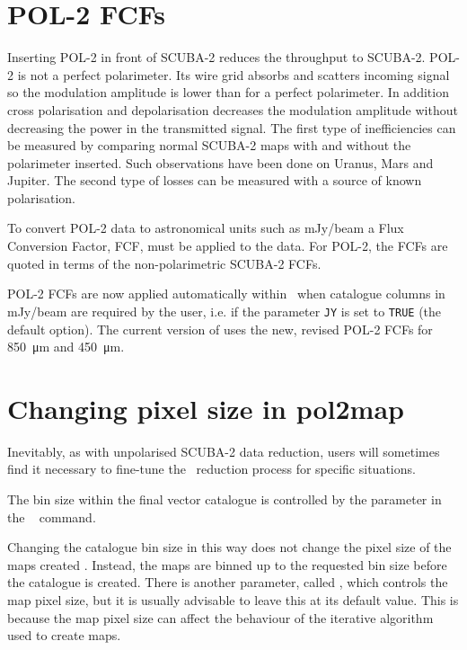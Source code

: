 \section{POL-2 FCFs}
\label{sec:pol2map-fcf}

Inserting POL-2 in front of SCUBA-2 reduces the throughput to SCUBA-2.
POL-2 is not a perfect polarimeter. Its wire grid absorbs and scatters incoming
signal so the modulation amplitude is lower than for a perfect polarimeter.
In addition cross polarisation and depolarisation decreases the modulation
amplitude without decreasing the power in the transmitted signal. The first
type of inefficiencies can be measured by comparing normal SCUBA-2 maps with
and without the polarimeter inserted. Such observations have been done on Uranus,
Mars and Jupiter. The second type of losses can be measured with a source of known polarisation.

To convert POL-2 data to astronomical units such as mJy/beam a Flux Conversion
Factor, FCF, must be applied to the data. For POL-2, the FCFs are quoted in terms of
the non-polarimetric SCUBA-2 FCFs.

POL-2 FCFs are now applied automatically within \poltwomap\ when catalogue columns
in mJy/beam are required by the user, i.e. if the  parameter \texttt{JY} is set
to \texttt{TRUE} (the default option). The current version of  uses the new,
revised POL-2 FCFs for \SI{850}{\micro\metre} and \SI{450}{\micro\metre}.

\section{Changing pixel size in pol2map}
\label{sec:pol2map-pixelsize}

Inevitably, as with unpolarised SCUBA-2 data reduction, users will sometimes find it
necessary to fine-tune the \poltwomap\ reduction process for specific situations.

The bin size within the final vector catalogue is controlled by the
 parameter in the \SMURF\  command.

\begin{terminalv}
\end{terminalv}

Changing the catalogue bin size in this way does not change the pixel
size of the maps created \poltwomap. Instead, the maps are binned up
to the requested bin size before the catalogue is created. There is
another parameter, called , which controls the map pixel
size, but it is usually advisable to leave this at its default value. This is
because the map pixel size can affect the behaviour of the iterative algorithm
used to create maps.







